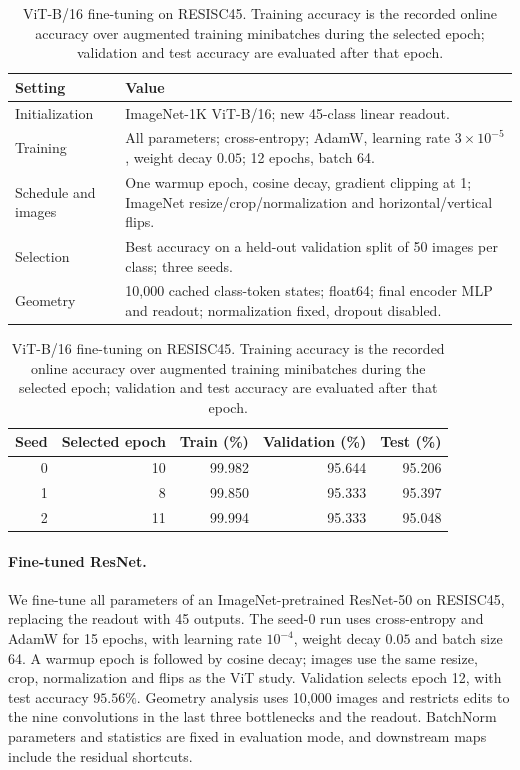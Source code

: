 \begin{table}[!htbp]\centering
\caption{ViT-B/16 fine-tuning on RESISC45. Training accuracy is the recorded online accuracy over augmented training minibatches during the selected epoch; validation and test accuracy are evaluated after that epoch.}\label{tab:native-vit-training}
\small\begin{tabular}{p{.28\linewidth}p{.64\linewidth}}\toprule
Setting & Value\\\midrule
Initialization & ImageNet-1K ViT-B/16; new 45-class linear readout.\\
Training & All parameters; cross-entropy; AdamW, learning rate $3\times10^{-5}$, weight decay $0.05$; 12 epochs, batch 64.\\
Schedule and images & One warmup epoch, cosine decay, gradient clipping at 1; ImageNet resize/crop/normalization and horizontal/vertical flips.\\
Selection & Best accuracy on a held-out validation split of 50 images per class; three seeds.\\
Geometry & 10,000 cached class-token states; float64; final encoder MLP and readout; normalization fixed, dropout disabled.\\\bottomrule
\end{tabular}
\par\smallskip
\begin{tabular}{rrrrr}\toprule
Seed & Selected epoch & Train (\%) & Validation (\%) & Test (\%)\\\midrule
0 & 10 & 99.982 & 95.644 & 95.206\\
1 & 8 & 99.850 & 95.333 & 95.397\\
2 & 11 & 99.994 & 95.333 & 95.048\\
\bottomrule\end{tabular}
\end{table}
\paragraph{Fine-tuned ResNet.}\label{app:methods-resnet}
We fine-tune all parameters of an ImageNet-pretrained ResNet-50 on RESISC45, replacing the readout with 45 outputs. The seed-0 run uses cross-entropy and AdamW for 15 epochs, with learning rate $10^{-4}$, weight decay $0.05$ and batch size 64. A warmup epoch is followed by cosine decay; images use the same resize, crop, normalization and flips as the ViT study. Validation selects epoch 12, with test accuracy $95.56\%$. Geometry analysis uses 10,000 images and restricts edits to the nine convolutions in the last three bottlenecks and the readout. BatchNorm parameters and statistics are fixed in evaluation mode, and downstream maps include the residual shortcuts.

